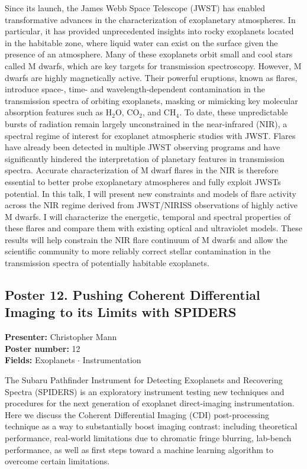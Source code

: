 Since its launch, the James Webb Space Telescope (JWST) has enabled transformative advances in the characterization of exoplanetary atmospheres. In particular, it has provided unprecedented insights into rocky exoplanets located in the habitable zone, where liquid water can exist on the surface given the presence of an atmosphere. Many of these exoplanets orbit small and cool stars called M dwarfs, which are key targets for transmission spectroscopy. However, M dwarfs are highly magnetically active. Their powerful eruptions, known as flares, introduce space-, time- and wavelength-dependent contamination in the transmission spectra of orbiting exoplanets, masking or mimicking key molecular absorption features such as H$_2$O, CO$_2$, and CH$_4$. To date, these unpredictable bursts of radiation remain largely unconstrained in the near-infrared (NIR), a spectral regime of interest for exoplanet atmospheric studies with JWST. Flares have already been detected in multiple JWST observing programs and have significantly hindered the interpretation of planetary features in transmission spectra. Accurate characterization of M dwarf flares in the NIR is therefore essential to better probe exoplanetary atmospheres and fully exploit JWSTs potential. In this talk, I will present new constraints and models of flare activity across the NIR regime derived from JWST/NIRISS observations of highly active M dwarfs. I will characterize the energetic, temporal and spectral properties of these flares and compare them with existing optical and ultraviolet models. These results will help constrain the NIR flare continuum of M dwarfs and allow the scientific community to more reliably correct stellar contamination in the transmission spectra of potentially habitable exoplanets.

\hypertarget{poster-abstract-talk-90}{}\label{poster-abstract-page-talk-90}
\subsection*{Poster 12. Pushing Coherent Differential Imaging to its Limits with SPIDERS}
\textbf{Presenter:} Christopher Mann\\
\textbf{Poster number:} 12\\
\textbf{Fields:} Exoplanets $\cdot$ Instrumentation

The Subaru Pathfinder Instrument for Detecting Exoplanets and Recovering Spectra (SPIDERS) is an exploratory instrument testing new techniques and procedures for the next generation of exoplanet direct-imaging instrumentation. Here we discuss the Coherent Differential Imaging (CDI) post-processing technique as a way to substantially boost imaging contrast: including theoretical performance, real-world limitations due to chromatic fringe blurring, lab-bench performance, as well as first steps toward a machine learning algorithm to overcome certain limitations.

